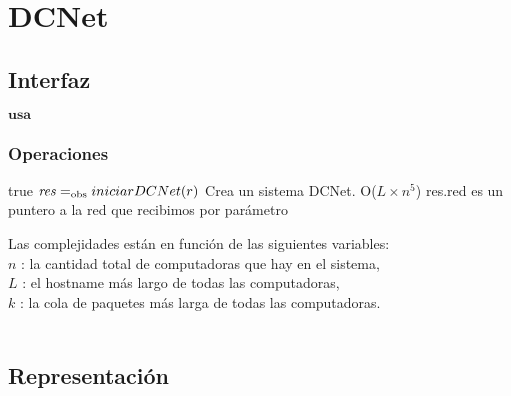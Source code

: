 
\section{DCNet}

\subsection{Interfaz}

$\textbf{usa}$  


\subsubsection*{Operaciones}


 {true}
 {$\text{\textit{res}} =_{\mathrm{obs}} iniciarDCNet(r)$}
 {Crea un sistema DCNet.}
 {O($L \times n^5$)}
 {res.red es un puntero a la red que recibimos por parámetro}
 
Las complejidades están en función de las siguientes variables:\\
$n$ : la cantidad total de computadoras que hay en el sistema, \\
$L$ : el hostname más largo de todas las computadoras, \\
$k$ : la cola de paquetes más larga de todas las computadoras. 
\\ \\



\subsection{Representación}


